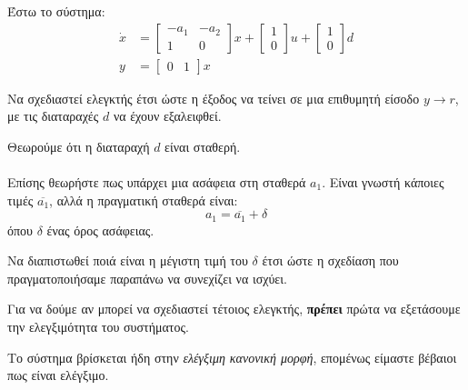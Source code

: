 \documentclass[11pt,a4paper,notitlepage,fleqn]{article}
\begin{document}
\begin{exercise}
	Έστω το σύστημα:
	\begin{align*}
		\dot x &= \left[\begin{matrix}
		-a_1 & -a_2 \\ 1 & 0
		\end{matrix}\right]x + \left[\begin{matrix}
		1 \\ 0
		\end{matrix}\right]u + \left[\begin{matrix}
		1 \\ 0
		\end{matrix}\right]d \\
		y &= \left[\begin{matrix}
		0 & 1
		\end{matrix}\right]x
	\end{align*}
	
	Να σχεδιαστεί ελεγκτής έτσι ώστε η έξοδος να τείνει σε μια επιθυμητή είσοδο \( y \to r \), με τις διαταραχές \( d \) να έχουν εξαλειφθεί.
	
	Θεωρούμε ότι η διαταραχή \( d \) είναι σταθερή.
	
	\paragraph{}
	Επίσης θεωρήστε πως υπάρχει μια ασάφεια στη σταθερά \( a_1 \).
	Είναι γνωστή κάποιες τιμές \( \overline{a_1} \), αλλά η πραγματική σταθερά είναι:
	\[
	a_1 = \overline{a_1} + \delta
	\]
	όπου \( \delta \) ένας όρος ασάφειας.
	
	Να διαπιστωθεί ποιά είναι η μέγιστη τιμή του \( δ \) έτσι ώστε η σχεδίαση που πραγματοποιήσαμε παραπάνω να συνεχίζει να ισχύει.
	
	\tcblower
	Για να δούμε αν μπορεί να σχεδιαστεί τέτοιος ελεγκτής, \textbf{πρέπει} πρώτα να εξετάσουμε
	την ελεγξιμότητα του συστήματος.
	
	Το σύστημα βρίσκεται ήδη στην \textit{ελέγξιμη κανονική μορφή}, επομένως
	είμαστε βέβαιοι πως είναι ελέγξιμο.
	

\end{exercise}
\end{document}

